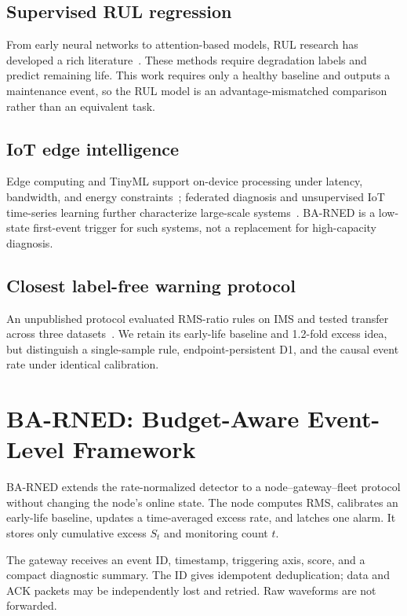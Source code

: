 \documentclass[journal]{IEEEtran}
\begin{document}
\subsection{Supervised RUL regression}
From early neural networks to attention-based models, RUL research has developed a rich literature~\cite{wang2020,gebraeel2004,chen2021}. These methods require degradation labels and predict remaining life. This work requires only a healthy baseline and outputs a maintenance event, so the RUL model is an advantage-mismatched comparison rather than an equivalent task.

\subsection{IoT edge intelligence}
Edge computing and TinyML support on-device processing under latency, bandwidth, and energy constraints~\cite{lu2023edge,abadade2023tinyml}; federated diagnosis and unsupervised IoT time-series learning further characterize large-scale systems~\cite{xiao2024bcefl,liu2023iot}. BA-RNED is a low-state first-event trigger for such systems, not a replacement for high-capacity diagnosis.

\subsection{Closest label-free warning protocol}
An unpublished protocol evaluated RMS-ratio rules on IMS and tested transfer across three datasets~\cite{hora_submitted,hora_unpublished}. We retain its early-life baseline and 1.2-fold excess idea, but distinguish a single-sample rule, endpoint-persistent D1, and the causal event rate under identical calibration.

\section{BA-RNED: Budget-Aware Event-Level Framework}\label{sec:framework}
BA-RNED extends the rate-normalized detector to a node--gateway--fleet protocol without changing the node's online state. The node computes RMS, calibrates an early-life baseline, updates a time-averaged excess rate, and latches one alarm. It stores only cumulative excess $S_t$ and monitoring count $t$.

The gateway receives an event ID, timestamp, triggering axis, score, and a compact diagnostic summary. The ID gives idempotent deduplication; data and ACK packets may be independently lost and retried. Raw waveforms are not forwarded.
\end{document}
